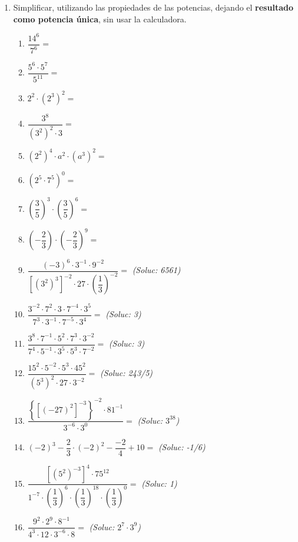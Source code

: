 \documentclass[a4paper,12pt]{article}
\begin{document}
\begin{enumerate}
    \item Simplificar, utilizando las propiedades de las potencias, dejando el \textbf{resultado como potencia única}, sin usar la calculadora.
        \begin{enumerate}
            \item $\dfrac{14^6}{7^6} =$
            \item $\dfrac{5^6 \cdot 5^7}{5^{11}} =$
            \item $2^2 \cdot \left(2^3\right)^2 =$
            \item $\dfrac{3^8}{\left(3^2\right)^2 \cdot 3} =$
            \item $\left(2^2\right)^4 \cdot a^2 \cdot \left(a^3\right)^2 =$
            \item $\left(2^5 \cdot 7^5\right)^0 =$
            \item $\left(\dfrac{3}{5}\right)^3 \cdot \left(\dfrac{3}{5}\right)^6 =$
            \item $\left(-\dfrac{2}{3}\right) \cdot \left(-\dfrac{2}{3}\right)^9 =$
            \item $\dfrac{(-3)^6 \cdot 3^{-1} \cdot 9^{-2}}{\left[\left(3^2\right)^3\right]^{-2} \cdot 27 \cdot \left(\dfrac{1}{3}\right)^{-2}} =$ \hfill \textit{(Soluc: 6561)}
            \item $\dfrac{3^{-2} \cdot 7^2 \cdot 3 \cdot 7^{-4} \cdot 3^5}{7^3 \cdot 3^{-1} \cdot 7^{-5} \cdot 3^4} =$ \hfill \textit{(Soluc: 3)}
            \item $\dfrac{3^8 \cdot 7^{-1} \cdot 5^2 \cdot 7^3 \cdot 3^{-2}}{7^4 \cdot 5^{-1} \cdot 3^5 \cdot 5^3 \cdot 7^{-2}} =$ \hfill \textit{(Soluc: 3)}
            \item $\dfrac{15^2 \cdot 5^{-2} \cdot 5^3 \cdot 45^2}{\left(5^3\right)^2 \cdot 27 \cdot 3^{-2}} =$ \hfill \textit{(Soluc: 243/5)}
            \item $\dfrac{\left\{\left[(-27)^2\right]^{-3}\right\}^{-2} \cdot 81^{-1}}{3^{-6} \cdot 3^0} =$ \hfill \textit{(Soluc: $3^{38}$)}
            \item $(-2)^3 - \dfrac{2}{3} \cdot (-2)^2 - \dfrac{-2}{4} + 10 =$ \hfill \textit{(Soluc: -1/6)}
            \item $\dfrac{\left[\left(5^2\right)^{-3}\right]^4 \cdot 75^{12}}{1^{-7} \cdot \left(\dfrac{1}{3}\right)^6 \cdot \left(\dfrac{1}{3}\right)^{18} \cdot \left(\dfrac{1}{3}\right)^0} =$ \hfill \textit{(Soluc: 1)}
            \item $\dfrac{9^2 \cdot 2^9 \cdot 8^{-1}}{4^3 \cdot 12 \cdot 3^{-6} \cdot 8} =$ \hfill \textit{(Soluc: $2^7 \cdot 3^9$)}

\end{enumerate}
\end{enumerate}
\end{document}
